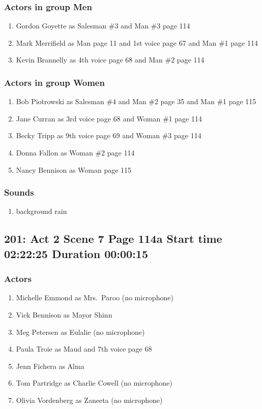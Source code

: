 \subsubsection{Actors in group Men}
\begin{enumerate}
\item Gordon Goyette as Salesman \#3 and Man \#3 page 114
\item Mark Merrifield as Man page 11 and 1st voice page 67 and Man \#1 page 114
\item Kevin Brannelly as 4th voice page 68 and Man \#2 page 114
\end{enumerate}
\subsubsection{Actors in group Women}
\begin{enumerate}
\item Bob Piotrowski as Salesman \#4 and Man \#2 page 35 and Man \#1 page 115
\item Jane Curran as 3rd voice page 68 and Woman \#1 page 114
\item Becky Tripp as 9th voice page 69 and Woman \#3 page 114
\item Donna Fallon as Woman \#2 page 114
\item Nancy Bennison as Woman page 115
\end{enumerate}

\subsubsection{Sounds}
\begin{enumerate}
\item background rain
\end{enumerate}
\subsection{201: Act 2 Scene 7 Page 114a Start time 02:22:25 Duration 00:00:15}

\subsubsection{Actors}
\begin{enumerate}
\item Michelle Emmond as Mrs.~Paroo (no microphone)
\item Vick Bennison as Mayor Shinn
\item Meg Petersen as Eulalie (no microphone)
\item Paula Troie as Maud and 7th voice page 68
\item Jenn Fichera as Alma
\item Tom Partridge as Charlie Cowell (no microphone)
\item Olivia Vordenberg as Zaneeta (no microphone)
\end{enumerate}
